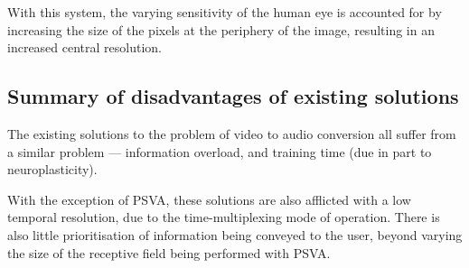 With this system, the varying sensitivity of the human eye is accounted for by increasing the size of the pixels at the periphery of the image, resulting in an increased central resolution.

\subsection{Summary of disadvantages of existing solutions}
The existing solutions to the problem of video to audio conversion all suffer from a similar problem --- information overload, and training time (due in part to neuroplasticity).

With the exception of PSVA, these solutions are also afflicted with a low temporal resolution, due to the time-multiplexing mode of operation. There is also little prioritisation of information being conveyed to the user, beyond varying the size of the receptive field being performed with PSVA.
